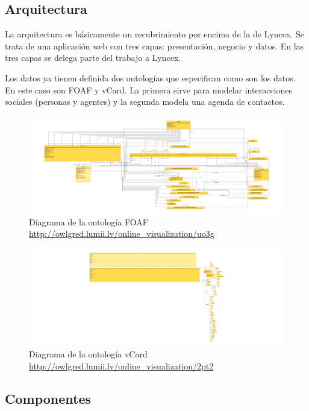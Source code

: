 \documentclass[12pt]{report} %
\begin{document}
\subsection{Arquitectura}

La arquitectura es básicamente un recubrimiento por encima de la de Lyncex. Se trata de una aplicación web con tres capas: presentación, negocio y datos. En las tres capas se delega parte del trabajo a Lyncex.

Los datos ya tienen definida dos ontologías que especifican como son los datos. En este caso son FOAF y vCard. La primera sirve para modelar interacciones sociales (personas y agentes) y la segunda modela una agenda de contactos. 

\begin{figure}
    \centering
    \includegraphics[width=\textwidth]{foaf.png}
    \caption{Diagrama de la ontología FOAF \\ \url{http://owlgred.lumii.lv/online_visualization/uo3g}}
    \label{fig:foaf}
\end{figure}

\begin{figure}
    \centering
    \includegraphics[width=\textwidth]{vcard.png}
    \caption{Diagrama de la ontología vCard \\ \url{http://owlgred.lumii.lv/online_visualization/2pt2}}
    \label{fig:vcard}
\end{figure}

\subsection{Componentes}
\end{document}
